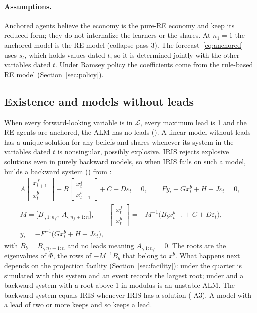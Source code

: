 \documentclass[11pt,a4paper]{article}
\begin{document}
\paragraph{Assumptions.} Anchored agents believe the economy is the pure-RE economy and keep its
reduced form; they do not internalize the learners or the shares. At $n_1=1$ the anchored model
is the RE model (collapse pass 3). The forecast~\eqref{eq:anchored} uses $s_t$, which holds
values dated $t$, so it is determined jointly with the other variables dated $t$. Under Ramsey
policy the coefficients come from the rule-based RE model (Section~\ref{sec:policy}).

\subsection{Existence and models without leads}\label{sec:backward}

When every forward-looking variable is in $\mathcal{L}$, every maximum lead is 1 and the RE agents
are anchored, the ALM has no leads (). A linear model without leads
has a unique solution for any beliefs and shares whenever its system in the variables dated $t$
is nonsingular,
possibly explosive. IRIS rejects explosive solutions even in purely backward models, so when IRIS
fails on such a model,  builds a backward system
() from :
\begin{gather}
  A\begin{bmatrix} x^f_{t+1} \\ x^b_t\end{bmatrix} + B\begin{bmatrix} x^f_t \\ x^b_{t-1}\end{bmatrix} + C + D\varepsilon_t = 0,
  \qquad F y_t + G x^b_t + H + J\varepsilon_t = 0,\\
  M = \bigl[B_{\cdot,1:n_f},\ A_{\cdot,n_f+1:n}\bigr],\qquad
  \begin{bmatrix} x^f_t \\ x^b_t\end{bmatrix} = -M^{-1}\bigl(B_b x^b_{t-1} + C + D\varepsilon_t\bigr),\\
  y_t = -F^{-1}\bigl(G x^b_t + H + J\varepsilon_t\bigr),
\end{gather}
with $B_b = B_{\cdot,n_f+1:n}$ and no leads meaning $A_{\cdot,1:n_f}=0$. The roots are the
eigenvalues of $\Phi$, the rows of $-M^{-1}B_b$ that belong to $x^b$. What happens next depends on
the projection facility (Section~\ref{sec:facility}): under  the quarter is simulated
with this system and an  event records the largest root; under  and
 a backward system with a root above 1 in modulus is an unstable ALM. The backward
system equals IRIS  whenever IRIS has a solution ( A3). A model
with a lead of two or more keeps  and so keeps a lead.
\end{document}
